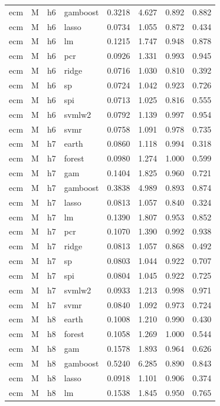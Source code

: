 \begin{ThreePartTable}
\begin{longtable}[t]{llclcccc}
ecm & M & h6 & gamboost & 0.3218 & 4.627 & 0.892 & 0.882\\
ecm & M & h6 & lasso & 0.0734 & 1.055 & 0.872 & 0.434\\
ecm & M & h6 & lm & 0.1215 & 1.747 & 0.948 & 0.878\\
ecm & M & h6 & pcr & 0.0926 & 1.331 & 0.993 & 0.945\\
ecm & M & h6 & ridge & 0.0716 & 1.030 & 0.810 & 0.392\\
ecm & M & h6 & sp & 0.0724 & 1.042 & 0.923 & 0.726\\
ecm & M & h6 & spi & 0.0713 & 1.025 & 0.816 & 0.555\\
ecm & M & h6 & svmlw2 & 0.0792 & 1.139 & 0.997 & 0.954\\
ecm & M & h6 & svmr & 0.0758 & 1.091 & 0.978 & 0.735\\
\addlinespace
ecm & M & h7 & earth & 0.0860 & 1.118 & 0.994 & 0.318\\
ecm & M & h7 & forest & 0.0980 & 1.274 & 1.000 & 0.599\\
ecm & M & h7 & gam & 0.1404 & 1.825 & 0.960 & 0.721\\
ecm & M & h7 & gamboost & 0.3838 & 4.989 & 0.893 & 0.874\\
ecm & M & h7 & lasso & 0.0813 & 1.057 & 0.840 & 0.324\\
ecm & M & h7 & lm & 0.1390 & 1.807 & 0.953 & 0.852\\
ecm & M & h7 & pcr & 0.1070 & 1.390 & 0.992 & 0.938\\
ecm & M & h7 & ridge & 0.0813 & 1.057 & 0.868 & 0.492\\
ecm & M & h7 & sp & 0.0803 & 1.044 & 0.922 & 0.707\\
ecm & M & h7 & spi & 0.0804 & 1.045 & 0.922 & 0.725\\
ecm & M & h7 & svmlw2 & 0.0933 & 1.213 & 0.998 & 0.971\\
ecm & M & h7 & svmr & 0.0840 & 1.092 & 0.973 & 0.724\\
\addlinespace
ecm & M & h8 & earth & 0.1008 & 1.210 & 0.990 & 0.430\\
ecm & M & h8 & forest & 0.1058 & 1.269 & 1.000 & 0.544\\
ecm & M & h8 & gam & 0.1578 & 1.893 & 0.964 & 0.626\\
ecm & M & h8 & gamboost & 0.5240 & 6.285 & 0.890 & 0.843\\
ecm & M & h8 & lasso & 0.0918 & 1.101 & 0.906 & 0.374\\
ecm & M & h8 & lm & 0.1538 & 1.845 & 0.950 & 0.765\\

\end{longtable}
\end{ThreePartTable}
